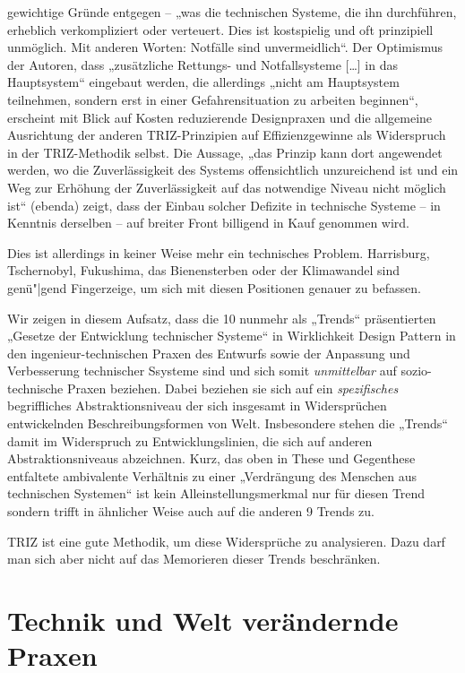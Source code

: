 \documentclass[11pt,a4paper]{article}
\begin{document}
gewichtige Gründe entgegen -- „was die technischen Systeme, die ihn
durchführen, erheblich verkompliziert oder verteuert. Dies ist kostspielig und
oft prinzipiell unmöglich. Mit anderen Worten: Notfälle sind unvermeidlich“.
Der Optimismus der Autoren, dass „zusätzliche Rettungs- und Notfallsysteme
[\ldots] in das Hauptsystem“ eingebaut werden, die allerdings „nicht am
Hauptsystem teilnehmen, sondern erst in einer Gefahrensituation zu arbeiten
beginnen“, erscheint mit Blick auf Kosten reduzierende Designpraxen und die
allgemeine Ausrichtung der anderen TRIZ-Prinzipien auf Effizienzgewinne als
Widerspruch in der TRIZ-Methodik selbst. Die Aussage, „das Prinzip kann dort
angewendet werden, wo die Zuverlässigkeit des Systems offensichtlich
unzureichend ist und ein Weg zur Erhöhung der Zuverlässigkeit auf das
notwendige Niveau nicht möglich ist“ (ebenda) zeigt, dass der Einbau solcher
Defizite in technische Systeme -- in Kenntnis derselben -- auf breiter Front
billigend in Kauf genommen wird.

Dies ist allerdings in keiner Weise mehr ein technisches Problem.  Harrisburg,
Tschernobyl, Fukushima, das Bienensterben \cite{Jacobasch2019} oder der
Klimawandel sind genü"|gend Fingerzeige, um sich mit diesen Positionen genauer
zu befassen.

Wir zeigen in diesem Aufsatz, dass die 10 nunmehr als „Trends“ präsentierten
„Gesetze der Entwicklung technischer Systeme“ in Wirklichkeit Design Pattern
in den ingenieur-technischen Praxen des Entwurfs sowie der Anpassung und
Verbesserung technischer Ssysteme sind und sich somit \emph{unmittelbar} auf
sozio-technische Praxen beziehen. Dabei beziehen sie sich auf ein
\emph{spezifisches} begriffliches Abstraktionsniveau der sich insgesamt in
Widersprüchen entwickelnden Beschreibungsformen von Welt. Insbesondere stehen
die „Trends“ damit im Widerspruch zu Entwicklungslinien, die sich auf anderen
Abstraktionsniveaus abzeichnen. Kurz, das oben in These und Gegenthese
entfaltete ambivalente Verhältnis zu einer „Verdrängung des Menschen aus
technischen Systemen“ ist kein Alleinstellungsmerkmal nur für diesen Trend
sondern trifft in ähnlicher Weise auch auf die anderen 9 Trends zu.

TRIZ ist eine gute Methodik, um diese Widersprüche zu analysieren. Dazu darf
man sich aber nicht auf das Memorieren dieser Trends beschränken.  

\section{Technik und Welt verändernde Praxen}
\end{document}
